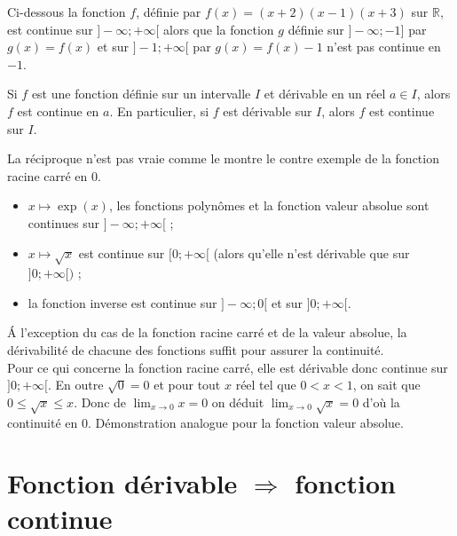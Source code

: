 \documentclass[french]{book}
\begin{document}
\begin{exemple}
 Ci-dessous la fonction $f$, définie par $f(x)=(x+2)(x-1)(x+3)$ sur $\mathbb{R}$, est continue sur $]-\infty;+\infty[$ alors que la fonction $g$ définie sur $]-\infty;-1]$ par $g(x)=f(x)$ et sur $]-1;+\infty[$ par $g(x)=f(x)-1$ n'est pas continue en $-1$.
\end{exemple}


\begin{prop}
 Si $f$ est une fonction définie sur un intervalle $I$ et dérivable en un réel $a\in I$, alors $f$ est continue en $a$. En particulier, si $f$ est dérivable sur $I$, alors $f$ est continue sur $I$.
\end{prop}

\begin{rem}
 La réciproque n'est pas vraie comme le montre le contre exemple de la fonction racine carré en 0.
\end{rem}


\begin{prop}
\begin{itemize}
 \item[$\bullet$] $x\mapsto \exp(x)$, les fonctions polynômes et la fonction valeur absolue sont continues sur $]-\infty;+\infty[$ ;
\item[$\bullet$] $x\mapsto \sqrt{x}$ est continue sur $[0;+\infty[$ (alors qu'elle n'est dérivable que sur $]0;+\infty[)$ ;
\item[$\bullet$] la fonction inverse est continue sur $]-\infty;0[$ et sur $]0;+\infty[$.
\end{itemize}
\end{prop}

\begin{demo}
 \'A l'exception du cas de la fonction racine carré et de la valeur absolue, la dérivabilité de chacune des fonctions suffit pour assurer la continuité.\\
Pour ce qui concerne la fonction racine carré, elle est dérivable donc continue sur $]0;+\infty[$. En outre $\sqrt{0}=0$ et pour tout $x$ réel tel que $0<x<1$, on sait que $0\leq\sqrt{x}\leq x$. Donc de $\lim_{x\rightarrow 0}x=0$ on déduit $\lim_{x\rightarrow 0}\sqrt{x}=0$ d'où la continuité en 0. Démonstration analogue pour la fonction valeur absolue.
\end{demo}

\section{Fonction dérivable $ \Longrightarrow $ fonction continue }
\end{document}
